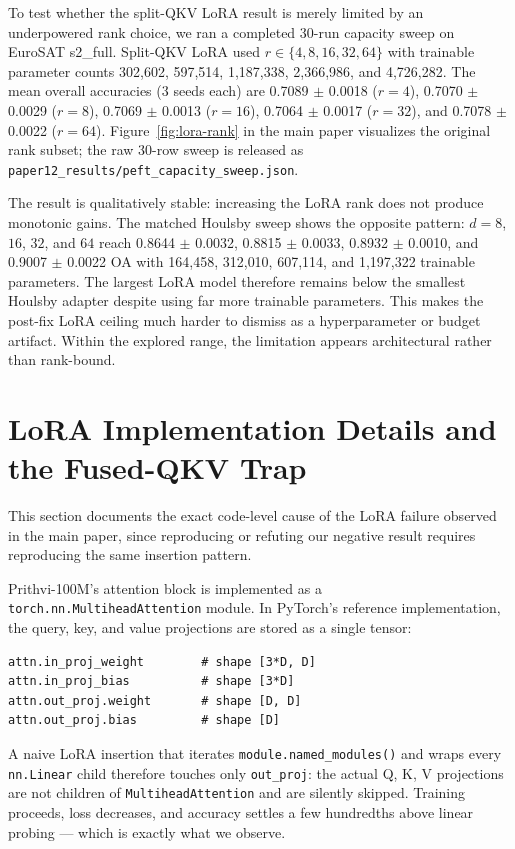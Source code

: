 To test whether the split-QKV LoRA result is merely limited by an underpowered rank choice, we ran a completed 30-run capacity sweep on EuroSAT s2\_full. Split-QKV LoRA used $r\in\{4,8,16,32,64\}$ with trainable parameter counts 302{,}602, 597{,}514, 1{,}187{,}338, 2{,}366{,}986, and 4{,}726{,}282. The mean overall accuracies (3 seeds each) are 0.7089 $\pm$ 0.0018 ($r=4$), 0.7070 $\pm$ 0.0029 ($r=8$), 0.7069 $\pm$ 0.0013 ($r=16$), 0.7064 $\pm$ 0.0017 ($r=32$), and 0.7078 $\pm$ 0.0022 ($r=64$). Figure~\ref{fig:lora-rank} in the main paper visualizes the original rank subset; the raw 30-row sweep is released as \texttt{paper12\_results/peft\_capacity\_sweep.json}.

The result is qualitatively stable: increasing the LoRA rank does not produce monotonic gains. The matched Houlsby sweep shows the opposite pattern: $d=8$, $16$, $32$, and $64$ reach 0.8644 $\pm$ 0.0032, 0.8815 $\pm$ 0.0033, 0.8932 $\pm$ 0.0010, and 0.9007 $\pm$ 0.0022 OA with 164{,}458, 312{,}010, 607{,}114, and 1{,}197{,}322 trainable parameters. The largest LoRA model therefore remains below the smallest Houlsby adapter despite using far more trainable parameters. This makes the post-fix LoRA ceiling much harder to dismiss as a hyperparameter or budget artifact. Within the explored range, the limitation appears architectural rather than rank-bound.

\section{LoRA Implementation Details and the Fused-QKV Trap}
\label{app:lora-trap}

This section documents the exact code-level cause of the LoRA failure observed in the main paper, since reproducing or refuting our negative result requires reproducing the same insertion pattern.

Prithvi-100M's attention block is implemented as a \texttt{torch.nn.MultiheadAttention} module. In PyTorch's reference implementation, the query, key, and value projections are stored as a single tensor:

\begin{verbatim}
attn.in_proj_weight        # shape [3*D, D]
attn.in_proj_bias          # shape [3*D]
attn.out_proj.weight       # shape [D, D]
attn.out_proj.bias         # shape [D]
\end{verbatim}

A naive LoRA insertion that iterates \texttt{module.named\_modules()} and wraps every \texttt{nn.Linear} child therefore touches only \texttt{out\_proj}: the actual Q, K, V projections are not children of \texttt{MultiheadAttention} and are silently skipped. Training proceeds, loss decreases, and accuracy settles a few hundredths above linear probing --- which is exactly what we observe.

